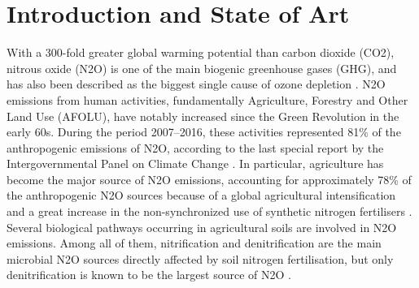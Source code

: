 \documentclass[12pt]{article}
\begin{document}
\section{Introduction and State of Art}
With a 300-fold greater global warming potential than carbon dioxide (CO2), nitrous
oxide (N2O) is one of the main biogenic greenhouse gases (GHG), and has also been
described as the biggest single cause of ozone depletion \cite{ravishankara2009nitrous}. N2O emissions from human
activities, fundamentally Agriculture, Forestry and Other Land Use (AFOLU), have notably
increased since the Green Revolution in the early 60s. During the period 2007–2016,
these activities represented 81\% of the anthropogenic emissions of N2O, according to the
last special report by the Intergovernmental Panel on Climate Change \cite{shukla2019climate}. In particular,
agriculture has become the major source of N2O emissions, accounting for approximately
78\% of the anthropogenic N2O sources \cite{shukla2019climate} because of a global agricultural intensification
and a great increase in the non-synchronized use of synthetic nitrogen fertilisers \cite{galloway2003nitrogen}\cite{richardson2009mitigating}\cite{taylor2010stoichiometric}.
Several biological pathways occurring in agricultural soils are involved in N2O emissions.
Among all of them, nitrification and denitrification are the main microbial N2O sources directly affected by soil nitrogen fertilisation, but only denitrification is known to be the
largest source of N2O \cite{thomson2012biological}.
\end{document}
